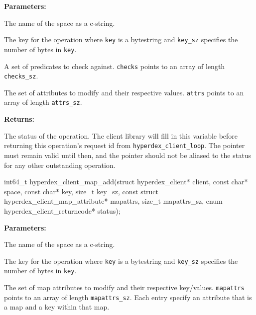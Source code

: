 \noindent\textbf{Parameters:}
\begin{description}[labelindent=\widthof{{\texttt{checks}, \texttt{checks\_sz}}},leftmargin=*,noitemsep,nolistsep,align=right]
\item[\texttt{space}] The name of the space as a c-string.
\item[\texttt{key}, \texttt{key\_sz}] The key for the operation where \texttt{key} is a bytestring and \texttt{key\_sz} specifies the number of bytes in \texttt{key}.
\item[\texttt{checks}, \texttt{checks\_sz}] A set of predicates to check against.  \texttt{checks} points to an array of length \texttt{checks\_sz}.
\item[\texttt{attrs}, \texttt{attrs\_sz}] The set of attributes to modify and their respective values.  \texttt{attrs} points to an array of length \texttt{attrs\_sz}.
\end{description}

\noindent\textbf{Returns:}
\begin{description}[labelindent=\widthof{{\texttt{status}}},leftmargin=*,noitemsep,nolistsep,align=right]
\item[\texttt{status}] The status of the operation.  The client library will fill in this variable before returning this operation's request id from \texttt{hyperdex\_client\_loop}.  The pointer must remain valid until then, and the pointer should not be aliased to the status for any other outstanding operation.
\end{description}

\funcsep
\begin{ccode}
int64_t hyperdex_client_map_add(struct hyperdex_client* client,
                const char* space,
                const char* key, size_t key_sz,
                const struct hyperdex_client_map_attribute* mapattrs, size_t mapattrs_sz,
                enum hyperdex_client_returncode* status);
\end{ccode}
\funcdesc 

\noindent\textbf{Parameters:}
\begin{description}[labelindent=\widthof{{\texttt{mapattrs}, \texttt{mapattrs\_sz}}},leftmargin=*,noitemsep,nolistsep,align=right]
\item[\texttt{space}] The name of the space as a c-string.
\item[\texttt{key}, \texttt{key\_sz}] The key for the operation where \texttt{key} is a bytestring and \texttt{key\_sz} specifies the number of bytes in \texttt{key}.
\item[\texttt{mapattrs}, \texttt{mapattrs\_sz}] The set of map attributes to modify and their respective key/values.  \texttt{mapattrs} points to an array of length \texttt{mapattrs\_sz}.  Each entry specify an attribute that is a map and a key within that map.
\end{description}

